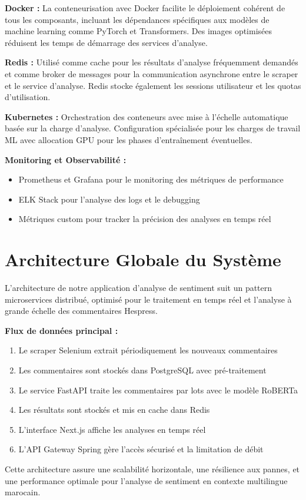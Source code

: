 \textbf{Docker :} La conteneurisation avec Docker facilite le déploiement cohérent de tous les composants, incluant les dépendances spécifiques aux modèles de machine learning comme PyTorch et Transformers. Des images optimisées réduisent les temps de démarrage des services d'analyse.

\textbf{Redis :} Utilisé comme cache pour les résultats d'analyse fréquemment demandés et comme broker de messages pour la communication asynchrone entre le scraper et le service d'analyse. Redis stocke également les sessions utilisateur et les quotas d'utilisation.

\textbf{Kubernetes :} Orchestration des conteneurs avec mise à l'échelle automatique basée sur la charge d'analyse. Configuration spécialisée pour les charges de travail ML avec allocation GPU pour les phases d'entraînement éventuelles.

\textbf{Monitoring et Observabilité :} 
\begin{itemize}
    \item Prometheus et Grafana pour le monitoring des métriques de performance
    \item ELK Stack pour l'analyse des logs et le debugging
    \item Métriques custom pour tracker la précision des analyses en temps réel
\end{itemize}

\section{Architecture Globale du Système}
L'architecture de notre application d'analyse de sentiment suit un pattern microservices distribué, optimisé pour le traitement en temps réel et l'analyse à grande échelle des commentaires Hespress.

\textbf{Flux de données principal :}
\begin{enumerate}
    \item Le scraper Selenium extrait périodiquement les nouveaux commentaires
    \item Les commentaires sont stockés dans PostgreSQL avec pré-traitement
    \item Le service FastAPI traite les commentaires par lots avec le modèle RoBERTa
    \item Les résultats sont stockés et mis en cache dans Redis
    \item L'interface Next.js affiche les analyses en temps réel
    \item L'API Gateway Spring gère l'accès sécurisé et la limitation de débit
\end{enumerate}

Cette architecture assure une scalabilité horizontale, une résilience aux pannes, et une performance optimale pour l'analyse de sentiment en contexte multilingue marocain.